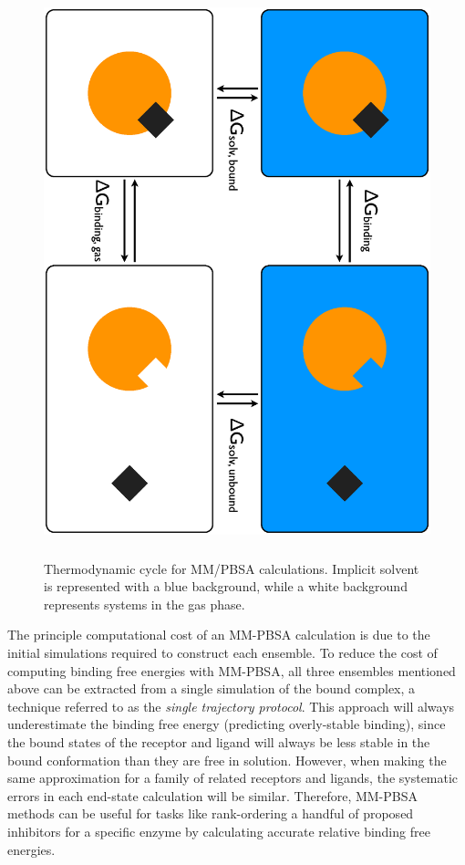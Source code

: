 \begin{figure}
   \includegraphics[height=6.5in, angle=90]{MMPBSA.ps}
   \caption[Thermodynamic cycle for MM/PBSA calculations.]
           {Thermodynamic cycle for MM/PBSA calculations. Implicit solvent is
            represented with a blue background, while a white background
            represents systems in the gas phase.}
   \label{fig2:MMPBSA}
\end{figure}

The principle computational cost of an MM-PBSA calculation is due to the initial
simulations required to construct each ensemble. To reduce the cost of computing
binding free energies with MM-PBSA, all three ensembles mentioned above can be
extracted from a single simulation of the bound complex, a technique referred to
as the \emph{single trajectory protocol}. \cite{MMPBSApy} This approach will
always underestimate the binding free energy (predicting overly-stable binding),
since the bound states of the receptor and ligand will always be less stable in
the bound conformation than they are free in solution. However, when making the
same approximation for a family of related receptors and ligands, the systematic
errors in each end-state calculation will be similar. Therefore, MM-PBSA methods
can be useful for tasks like rank-ordering a handful of proposed inhibitors for
a specific enzyme by calculating accurate relative binding free energies.
\cite{Homeyer2012}

